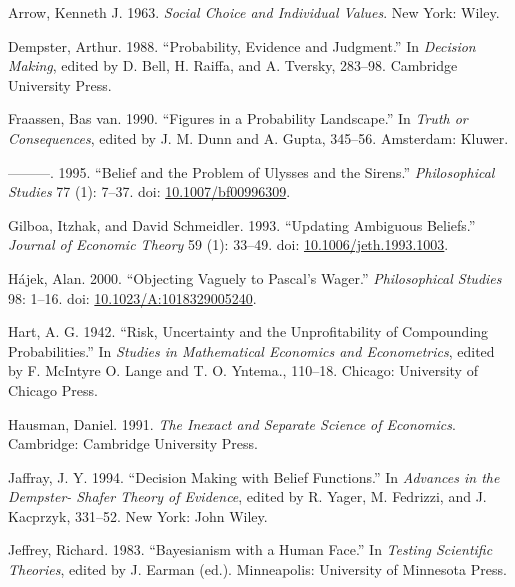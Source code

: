 \documentclass[
  10pt,
  letterpaper,
  DIV=11,
  numbers=noendperiod,
  twoside]{scrartcl}
\newlength{\cslhangindent}
\newenvironment{CSLReferences}[2] %
 {\begin{list}{}{%
  \setlength{\itemindent}{0pt}
  \setlength{\leftmargin}{0pt}
  \setlength{\parsep}{0pt}
  \ifodd #1
   \setlength{\leftmargin}{\cslhangindent}
   \setlength{\itemindent}{-1\cslhangindent}
  \fi
  \setlength{\itemsep}{#2\baselineskip}}}
 {\end{list}}
\begin{document}
\label{refs}
\begin{CSLReferences}{1}{0}
Arrow, Kenneth J. 1963. \emph{Social Choice and Individual Values}. New
York: Wiley.

Dempster, Arthur. 1988. {``Probability, Evidence and Judgment.''} In
\emph{Decision Making}, edited by D. Bell, H. Raiffa, and A. Tversky,
283--98. Cambridge University Press.

Fraassen, Bas van. 1990. {``Figures in a Probability Landscape.''} In
\emph{Truth or Consequences}, edited by J. M. Dunn and A. Gupta,
345--56. Amsterdam: Kluwer.

---------. 1995. {``Belief and the Problem of Ulysses and the Sirens.''}
\emph{Philosophical Studies} 77 (1): 7--37. doi:
\href{https://doi.org/10.1007/bf00996309}{10.1007/bf00996309}.

Gilboa, Itzhak, and David Schmeidler. 1993. {``Updating Ambiguous
Beliefs.''} \emph{Journal of Economic Theory} 59 (1): 33--49. doi:
\href{https://doi.org/10.1006/jeth.1993.1003}{10.1006/jeth.1993.1003}.

Hájek, Alan. 2000. {``Objecting Vaguely to Pascal's Wager.''}
\emph{Philosophical Studies} 98: 1--16. doi:
\href{https://doi.org/10.1023/A:1018329005240}{10.1023/A:1018329005240}.

Hart, A. G. 1942. {``Risk, Uncertainty and the Unprofitability of
Compounding Probabilities.''} In \emph{Studies in Mathematical Economics
and Econometrics}, edited by F. McIntyre O. Lange and T. O. Yntema.,
110--18. Chicago: University of Chicago Press.

Hausman, Daniel. 1991. \emph{The Inexact and Separate Science of
Economics}. Cambridge: Cambridge University Press.

Jaffray, J. Y. 1994. {``Decision Making with Belief Functions.''} In
\emph{Advances in the Dempster- Shafer Theory of Evidence}, edited by R.
Yager, M. Fedrizzi, and J. Kacprzyk, 331--52. New York: John Wiley.

Jeffrey, Richard. 1983. {``Bayesianism with a Human Face.''} In
\emph{Testing Scientific Theories}, edited by J. Earman (ed.).
Minneapolis: University of Minnesota Press.


\end{CSLReferences}
\end{document}

